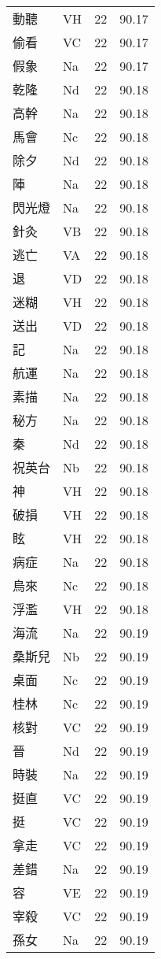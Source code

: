 \documentclass[twocolumn]{book}
\begin{document}
\begin{supertabular}{llrr}
動聽 & VH & 22 &  90.17\\
偷看 & VC & 22 &  90.17\\
假象 & Na & 22 &  90.17\\
乾隆 & Nd & 22 &  90.18\\
高幹 & Na & 22 &  90.18\\
馬會 & Nc & 22 &  90.18\\
除夕 & Nd & 22 &  90.18\\
陣 & Na & 22 &  90.18\\
閃光燈 & Na & 22 &  90.18\\
針灸 & VB & 22 &  90.18\\
逃亡 & VA & 22 &  90.18\\
退 & VD & 22 &  90.18\\
迷糊 & VH & 22 &  90.18\\
送出 & VD & 22 &  90.18\\
記 & Na & 22 &  90.18\\
航運 & Na & 22 &  90.18\\
素描 & Na & 22 &  90.18\\
秘方 & Na & 22 &  90.18\\
秦 & Nd & 22 &  90.18\\
祝英台 & Nb & 22 &  90.18\\
神 & VH & 22 &  90.18\\
破損 & VH & 22 &  90.18\\
眩 & VH & 22 &  90.18\\
病症 & Na & 22 &  90.18\\
烏來 & Nc & 22 &  90.18\\
浮濫 & VH & 22 &  90.18\\
海流 & Na & 22 &  90.19\\
桑斯兒 & Nb & 22 &  90.19\\
桌面 & Nc & 22 &  90.19\\
桂林 & Nc & 22 &  90.19\\
核對 & VC & 22 &  90.19\\
晉 & Nd & 22 &  90.19\\
時裝 & Na & 22 &  90.19\\
挺直 & VC & 22 &  90.19\\
挺 & VC & 22 &  90.19\\
拿走 & VC & 22 &  90.19\\
差錯 & Na & 22 &  90.19\\
容 & VE & 22 &  90.19\\
宰殺 & VC & 22 &  90.19\\
孫女 & Na & 22 &  90.19\\

\end{supertabular}
\end{document}
